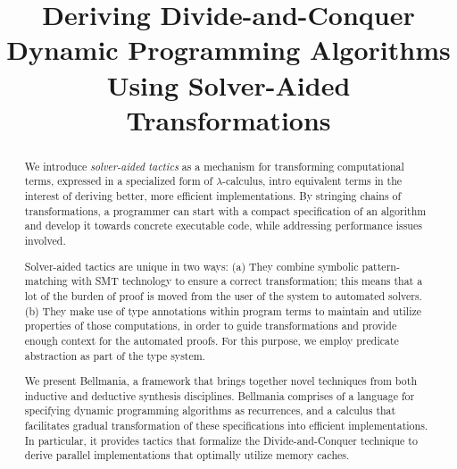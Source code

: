 \documentclass[preprint]{sigplanconf}
\newcommand\newterm[1]{{\it #1}}
\begin{document}
\setlength{\pdfpageheight}{\paperheight}
\setlength{\pdfpagewidth}{\paperwidth}



\title{Deriving Divide-and-Conquer Dynamic Programming Algorithms Using 
  Solver-Aided Transformations}

           {}
           {}

\maketitle

\begin{abstract}
We introduce \newterm{solver-aided tactics} as a mechanism for transforming
computational terms, expressed in a specialized form of $\lambda$-calculus,
intro equivalent terms in the interest of deriving better, more efficient
implementations. By stringing chains of transformations, a programmer can start
with a compact specification of an algorithm and develop it towards concrete
executable code, while addressing performance issues involved.

Solver-aided tactics are unique in two ways: 
(a) They combine symbolic pattern-matching
with SMT technology to ensure a correct transformation; this means that a lot of the
burden of proof is moved from the user of the system to automated solvers.
(b) They make use of type annotations within program terms to maintain and utilize
properties of those computations, in order to guide transformations and provide
enough context for the automated proofs. For this purpose, we employ predicate
abstraction as part of the type system.

We present Bellmania, a framework that brings together novel techniques from both
inductive and deductive synthesis disciplines.
Bellmania comprises of a language for specifying dynamic programming algorithms as recurrences,
and a calculus that facilitates gradual transformation of these 
specifications into efficient implementations.
In particular, it provides tactics that formalize the Divide-and-Conquer technique to derive
parallel implementations that optimally utilize memory caches.
\end{abstract}
\end{document}

